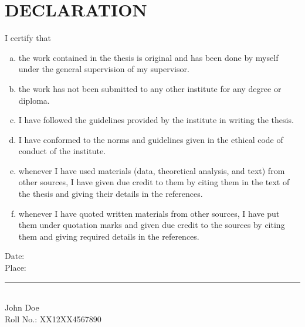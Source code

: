 \chapter*{\centering DECLARATION}

I certify that
\begin{enumerate}[a.]
	\item the work contained in the thesis is original and has been done by myself under the general supervision of my supervisor.
	\item the work has not been submitted to any other institute for any degree or diploma.
	\item I have followed the guidelines provided by the institute in writing the thesis.
	\item I have conformed to the norms and guidelines given in the ethical code of conduct of the institute.
	\item whenever I have used materials (data, theoretical analysis, and text) from other sources, I have given due credit to them by citing them in the text of the thesis and giving their details in the references.
	\item whenever I have quoted written materials from other sources, I have put them under quotation marks and given due credit to the sources by citing them and giving required details in the references.
\end{enumerate}
\vspace{4em}
\begin{minipage}[t]{0.35\textwidth}
    Date: \\
    Place:
\end{minipage}%
\hfill
\begin{minipage}[t]{0.4\textwidth}
\begin{flushright}
    \bfseries
    \rule{\textwidth}{1pt}\\
	John Doe\\
	Roll No.: XX12XX4567890
\end{flushright}
\end{minipage}

\newpage
\thispagestyle{empty}
\null\newpage
